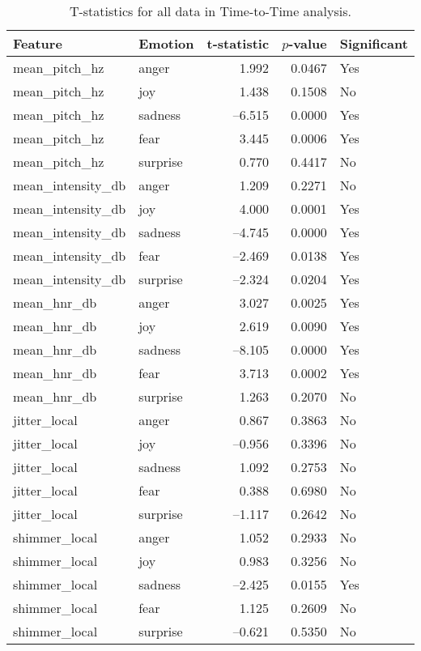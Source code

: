 \begin{table}[ht]
    \begin{tabular}{l l r r l}
      \toprule
      Feature               & Emotion  & t-statistic & $p$-value & Significant \\
      \midrule
      mean\_pitch\_hz       & anger    &  1.992 & 0.0467 & Yes \\
      mean\_pitch\_hz       & joy      &  1.438 & 0.1508 & No  \\
      mean\_pitch\_hz       & sadness  & –6.515 & 0.0000 & Yes \\
      mean\_pitch\_hz       & fear     &  3.445 & 0.0006 & Yes \\
      mean\_pitch\_hz       & surprise &  0.770 & 0.4417 & No  \\
      \addlinespace
      mean\_intensity\_db   & anger    &  1.209 & 0.2271 & No  \\
      mean\_intensity\_db   & joy      &  4.000 & 0.0001 & Yes \\
      mean\_intensity\_db   & sadness  & –4.745 & 0.0000 & Yes \\
      mean\_intensity\_db   & fear     & –2.469 & 0.0138 & Yes \\
      mean\_intensity\_db   & surprise & –2.324 & 0.0204 & Yes \\
      \addlinespace
      mean\_hnr\_db         & anger    &  3.027 & 0.0025 & Yes \\
      mean\_hnr\_db         & joy      &  2.619 & 0.0090 & Yes \\
      mean\_hnr\_db         & sadness  & –8.105 & 0.0000 & Yes \\
      mean\_hnr\_db         & fear     &  3.713 & 0.0002 & Yes \\
      mean\_hnr\_db         & surprise &  1.263 & 0.2070 & No  \\
      \addlinespace
      jitter\_local         & anger    &  0.867 & 0.3863 & No  \\
      jitter\_local         & joy      & –0.956 & 0.3396 & No  \\
      jitter\_local         & sadness  &  1.092 & 0.2753 & No  \\
      jitter\_local         & fear     &  0.388 & 0.6980 & No  \\
      jitter\_local         & surprise & –1.117 & 0.2642 & No  \\
      \addlinespace
      shimmer\_local        & anger    &  1.052 & 0.2933 & No  \\
      shimmer\_local        & joy      &  0.983 & 0.3256 & No  \\
      shimmer\_local        & sadness  & –2.425 & 0.0155 & Yes \\
      shimmer\_local        & fear     &  1.125 & 0.2609 & No  \\
      shimmer\_local        & surprise & –0.621 & 0.5350 & No  \\
      \bottomrule
    \end{tabular}
    \caption{T-statistics for all data in Time-to-Time analysis.}
    \label{tab:ttest_all_full}
  \end{table}
  

